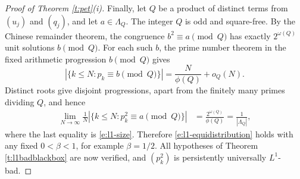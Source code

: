 \documentclass[12pt,reqno]{amsart}
\numberwithin{equation}{section}
\theoremstyle{definition}
\theoremstyle{remark}
\begin{document}
\begin{proof}[Proof of Theorem \ref{t:pet}\textup{(i)}]


Finally, let \(Q\) be a product of distinct terms from \((u_j)\) and
\((q_j)\), and let \(a\in\Lambda_Q\).  The integer \(Q\) is odd and
square-free.  By the Chinese
remainder theorem, the congruence $b^2\equiv a\pmod Q$ has exactly
$2^{\omega(Q)}$ unit solutions $b\pmod Q$.  For each such $b$, the prime
number theorem in the fixed arithmetic progression $b\pmod Q$ gives
\[
 |\{k\leq N:p_k\equiv b\pmod Q\}|
    =\frac{N}{\phi(Q)}+o_Q(N).
\]
  Distinct roots give disjoint
progressions, apart from the finitely many primes dividing $Q$, and hence
\begin{align*}
 \lim_{N\to\infty}\frac1N
 |\{k\leq N:p_k^2\equiv a\pmod Q\}|
 &=\frac{2^{\omega(Q)}}{\phi(Q)}
  =\frac1{|\Lambda_Q|},
\end{align*}
where the last equality is \eqref{e:l1-size}.  Therefore
\eqref{e:l1-equidistribution} holds with any fixed $0<\beta<1$, for example
$\beta=1/2$.  All hypotheses of Theorem \ref{t:l1badblackbox} are now
verified, and $(p_k^2)$ is persistently universally $L^1$-bad.
\end{proof}
\end{document}
